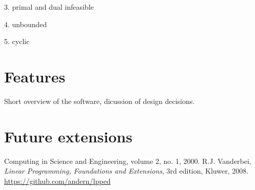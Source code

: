 \documentclass[ukenglish]{nik}
\begin{document}
3. primal and dual infeasible

4. unbounded

5. cyclic

\section{Features}
Short overview of the software, dicussion of design decisions.

\section{Future extensions}





\begin{thebibliography}{99}
 Computing in Science and Engineering, volume 2, no. 1, 2000.
 R.J. Vanderbei, 
\emph{Linear Programming, Foundations and Extensions},
3rd edition, Kluwer, 2008.
\url{https://github.com/andern/lpped}
\end{thebibliography}
\end{document}
